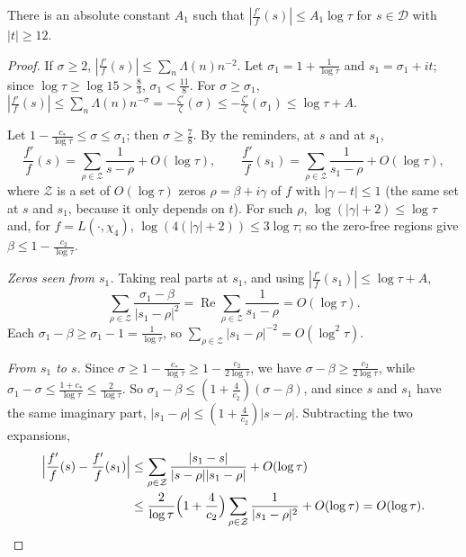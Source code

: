 \begin{lemma}\label{lem:logderivK}
There is an absolute constant $A_1$ such that $|\frac{f'}f(s)|\le A_1\log\tau$ for $s\in\mathcal D$ with $|t|\ge12$.
\end{lemma}
\begin{proof}
If $\sigma\ge2$, $|\frac{f'}f(s)|\le\sum_n\Lambda(n)n^{-2}$. Let $\sigma_1=1+\frac1{\log\tau}$ and $s_1=\sigma_1+it$; since $\log\tau\ge\log15>\frac83$, $\sigma_1<\frac{11}8$. For $\sigma\ge\sigma_1$, $|\frac{f'}f(s)|\le\sum_n\Lambda(n)n^{-\sigma}=-\frac{\zeta'}\zeta(\sigma)\le-\frac{\zeta'}\zeta(\sigma_1)\le\log\tau+A$.

Let $1-\frac{c_*}{\log\tau}\le\sigma\le\sigma_1$; then $\sigma\ge\frac78$. By the reminders, at $s$ and at $s_1$,
\[
\frac{f'}f(s)=\sum_{\rho\in\mathcal Z}\frac1{s-\rho}+O(\log\tau),\qquad\frac{f'}f(s_1)=\sum_{\rho\in\mathcal Z}\frac1{s_1-\rho}+O(\log\tau),
\]
where $\mathcal Z$ is a set of $O(\log\tau)$ zeros $\rho=\beta+i\gamma$ of $f$ with $|\gamma-t|\le1$ (the same set at $s$ and $s_1$, because it only depends on $t$). For such $\rho$, $\log(|\gamma|+2)\le\log\tau$ and, for $f=L(\cdot,\chi_4)$, $\log(4(|\gamma|+2))\le3\log\tau$; so the zero-free regions give $\beta\le1-\frac{c_2}{\log\tau}$.

\emph{Zeros seen from $s_1$.} Taking real parts at $s_1$, and using $|\frac{f'}f(s_1)|\le\log\tau+A$,
\[
\sum_{\rho\in\mathcal Z}\frac{\sigma_1-\beta}{|s_1-\rho|^2}=\operatorname{Re}\sum_{\rho\in\mathcal Z}\frac1{s_1-\rho}=O(\log\tau).
\]
Each $\sigma_1-\beta\ge\sigma_1-1=\frac1{\log\tau}$, so $\sum_{\rho\in\mathcal Z}|s_1-\rho|^{-2}=O(\log^2\tau)$.

\emph{From $s_1$ to $s$.} Since $\sigma\ge1-\frac{c_*}{\log\tau}\ge1-\frac{c_2}{2\log\tau}$, we have $\sigma-\beta\ge\frac{c_2}{2\log\tau}$, while $\sigma_1-\sigma\le\frac{1+c_*}{\log\tau}\le\frac2{\log\tau}$. So $\sigma_1-\beta\le(1+\frac4{c_2})(\sigma-\beta)$, and since $s$ and $s_1$ have the same imaginary part, $|s_1-\rho|\le(1+\frac4{c_2})|s-\rho|$. Subtracting the two expansions,
\[
\begin{aligned}\Bigl|\frac{f'}f(s)-\frac{f'}f(s_1)\Bigr|&\le\sum_{\rho\in\mathcal Z}\frac{|s_1-s|}{|s-\rho||s_1-\rho|}+O(\log\tau)\\&\le\frac2{\log\tau}\Bigl(1+\frac4{c_2}\Bigr)\sum_{\rho\in\mathcal Z}\frac1{|s_1-\rho|^2}+O(\log\tau)=O(\log\tau).\end{aligned}\qedhere
\]
\end{proof}

